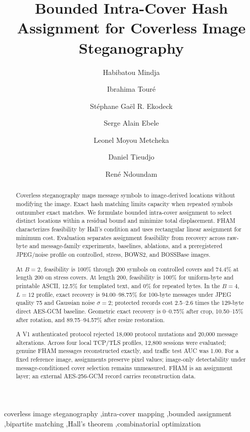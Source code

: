 \documentclass[preprint,12pt]{elsarticle}
\theoremstyle{plain}
\begin{document}
\begin{frontmatter}
\title{Bounded Intra-Cover Hash Assignment for Coverless Image Steganography}
\author[aff1]{Habibatou Mindja}
\author[aff2]{Ibrahima Tour\'e}
\author[aff1,aff4]{St\'ephane Ga\"el R. Ekodeck}
\author[aff1,aff4]{Serge Alain Ebele}
\author[aff1,aff4]{Leonel Moyou Metcheka}
\author[aff1]{Daniel Tieudjo}
\author[aff3,aff4]{Ren\'e Ndoundam}

\address[aff1]{University of Yaound\'e I, LIRIMA, Team GRIMCAPE, P.O. Box 812, Yaound\'e, Cameroon}

\address[aff2]{Institut Sup\'erieur des Technologies de Mamou, B.P. 063, Mamou, Republic of Guinea}

\address[aff3]{University of Bertoua, P.O. Box 416, Bertoua, Cameroon}

\address[aff4]{IRD, UMI UMMISCO, IRD France Nord, F-93143 Bondy, France}
\begin{abstract}
Coverless steganography maps message symbols to image-derived locations without modifying the image. Exact hash matching limits capacity when repeated symbols outnumber exact matches. We formulate bounded intra-cover assignment to select distinct locations within a residual bound and minimize total displacement. FHAM characterizes feasibility by Hall's condition and uses rectangular linear assignment for minimum cost. Evaluation separates assignment feasibility from recovery across raw-byte and message-family experiments, baselines, ablations, and a preregistered JPEG/noise profile on controlled, stress, BOWS2, and BOSSBase images.

At $B=2$, feasibility is 100\% through 200 symbols on controlled covers and 74.4\% at length 200 on stress covers. At length 200, feasibility is 100\% for uniform-byte and printable ASCII, 12.5\% for templated text, and 0\% for repeated bytes. In the $B=4$, $L=12$ profile, exact recovery is 94.00--98.75\% for 100-byte messages under JPEG quality 75 and Gaussian noise $\sigma=2$; protected records cost 2.5--2.6 times the 129-byte direct AES-GCM baseline. Geometric exact recovery is 0--0.75\% after crop, 10.50--15\% after rotation, and 89.75--94.57\% after resize restoration.

A V1 authenticated protocol rejected 18,000 protocol mutations and 20,000 message alterations. Across four local TCP/TLS profiles, 12,800 sessions were evaluated; genuine FHAM messages reconstructed exactly, and traffic test AUC was 1.00. For a fixed reference image, assignments preserve pixel values; image-only detectability under message-conditioned cover selection remains unmeasured. FHAM is an assignment layer; an external AES-256-GCM record carries reconstruction data.
\end{abstract}
\begin{keyword}
coverless image steganography \sep intra-cover mapping \sep bounded assignment \sep bipartite matching \sep Hall's theorem \sep combinatorial optimization
\end{keyword}
\end{frontmatter}
\end{document}
